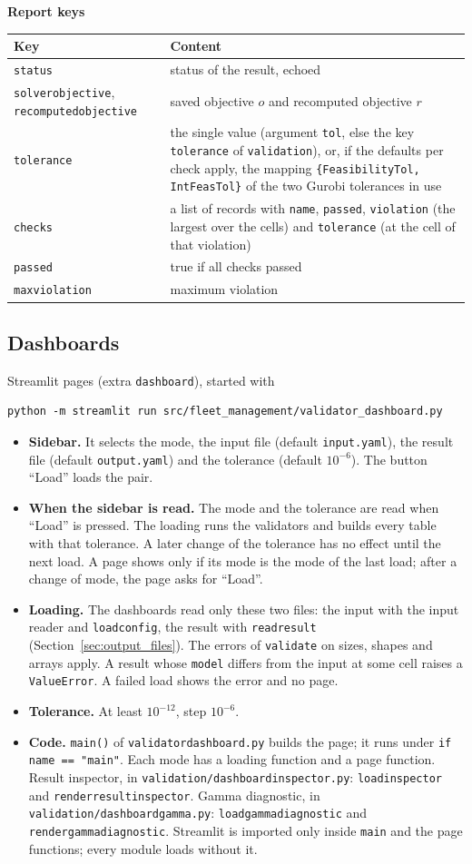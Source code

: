 \documentclass[11pt,a4paper]{article}
\makeatletter
\theoremstyle{plain}
\theoremstyle{definition}
\newcommand{\blockhead}[1]{\par\noindent\textbf{#1}\par\nobreak}
\renewcommand{\_}{\textunderscore\allowbreak{}}
\providecommand{\rejrow}[2]{{\raggedright #1\par} & {\raggedright #2\par} \\}
\providecommand{\tabstart}[2]{\begingroup\small\begin{longtable}{@{}#1@{}}\toprule #2 \\ \midrule \endhead}
\providecommand{\tabend}{\bottomrule\end{longtable}\endgroup}
\makeatother
\begin{document}
\blockhead{Report keys}
\tabstart{p{5.2cm}p{9.8cm}}{Key & Content}
\rejrow{\texttt{status}}{status of the result, echoed}
\rejrow{\texttt{solver\_objective}, \texttt{recomputed\_objective}}{saved objective $o$ and recomputed objective $r$}
\rejrow{\texttt{tolerance}}{the single value (argument \texttt{tol}, else the key \texttt{tolerance} of \texttt{validation}), or, if the defaults per check apply, the mapping \texttt{\{FeasibilityTol, IntFeasTol\}} of the two Gurobi tolerances in use}
\rejrow{\texttt{checks}}{a list of records with \texttt{name}, \texttt{passed}, \texttt{violation} (the largest over the cells) and \texttt{tolerance} (at the cell of that violation)}
\rejrow{\texttt{passed}}{true if all checks passed}
\rejrow{\texttt{max\_violation}}{maximum violation}
\tabend

\subsection{Dashboards}
\label{sec:validation_dashboards}

Streamlit pages (extra \texttt{dashboard}), started with
\begin{lstlisting}
python -m streamlit run src/fleet_management/validator_dashboard.py
\end{lstlisting}
\begin{itemize}[nosep]
  \item \textbf{Sidebar.} It selects the mode, the input file (default \texttt{input.yaml}), the result file (default \texttt{output.yaml}) and the tolerance (default $10^{-6}$). The button ``Load'' loads the pair.
  \item \textbf{When the sidebar is read.} The mode and the tolerance are read when ``Load'' is pressed. The loading runs the validators and builds every table with that tolerance. A later change of the tolerance has no effect until the next load. A page shows only if its mode is the mode of the last load; after a change of mode, the page asks for ``Load''.
  \item \textbf{Loading.} The dashboards read only these two files: the input with the input reader and \texttt{load\_config}, the result with \texttt{read\_result} (Section~\ref{sec:output_files}). The errors of \texttt{validate} on sizes, shapes and arrays apply. A result whose \texttt{model} differs from the input at some cell raises a \texttt{ValueError}. A failed load shows the error and no page.
  \item \textbf{Tolerance.} At least $10^{-12}$, step $10^{-6}$.
  \item \textbf{Code.} \texttt{main()} of \texttt{validator\_dashboard.py} builds the page; it runs under \texttt{if \_\_name\_\_ == "\_\_main\_\_"}. Each mode has a loading function and a page function. Result inspector, in \texttt{validation/dashboard\_inspector.py}: \texttt{load\_inspector} and \texttt{render\_result\_inspector}. Gamma diagnostic, in \texttt{validation/dashboard\_gamma.py}: \texttt{load\_gamma\_diagnostic} and \texttt{render\_gamma\_diagnostic}. Streamlit is imported only inside \texttt{main} and the page functions; every module loads without it.
\end{itemize}
\end{document}
